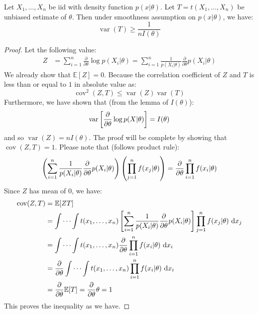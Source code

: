  \begin{theorem}
    Let $X_1,\dots,X_n$ be iid with density function $p(x|\theta)$. Let $T = t(X_1,\dots,X_n)$ be unbiased estimate of $\theta$. Then under smoothness assumption on $p(x|\theta)$, we have:
    \begin{equation*}
        \operatorname{var}(T) \ge \frac{1}{nI(\theta)}
    \end{equation*}
 \end{theorem}
 \begin{proof}
    Let the following value:
    \begin{equation*}
    \begin{aligned}
        Z &= \sum^n_{i=1}\frac{\partial}{\partial\theta}\log p(X_i|\theta) = \sum^n_{i=1}\frac{1}{p(X_i|\theta)} \frac{\partial}{\partial\theta } p(X_i|\theta)
    \end{aligned}
    \end{equation*}
    We already show that $\mathbb{E}[Z] = 0$. Because the correlation coefficient of $Z$ and $T$ is less than or equal to $1$ in absolute value as:
    \begin{equation*}
        \operatorname{cov}^2(Z, T) \le \operatorname{var}(Z)\operatorname{var}(T)
    \end{equation*}
    Furthermore, we have shown that (from the lemma of $I(\theta)$):
    \begin{equation*}
        \operatorname{var}\left[ \frac{\partial}{\partial\theta} \log p(X|\theta) \right] = I(\theta)
    \end{equation*}
    and so $\operatorname{var}(Z) = nI(\theta)$. The proof will be complete by showing that $\operatorname{cov}(Z, T) = 1$. Please note that (follows product rule):
    \begin{equation*}
        \left( \sum^n_{i=1}\frac{1}{p(X_i|\theta)} \frac{\partial}{\partial\theta } p(X_i|\theta) \right)\left( \prod^n_{j=1}f(x_j | \theta) \right) = \frac{\partial}{\partial\theta}\prod^n_{i=1}f(x_i|\theta)
    \end{equation*}
    Since $Z$ has mean of $0$, we have:
    \begin{equation*}
    \begin{aligned}
        \operatorname{cov}(Z, T) &= \mathbb{E}[ZT] \\
        &= \int\cdots\int t(x_1,\dots,x_n) \left[ \sum^n_{i=1}\frac{1}{p(X_i|\theta)} \frac{\partial}{\partial\theta } p(X_i|\theta) \right]\prod^n_{j=1}f(x_j|\theta)\ \mathrm{d} x_j \\
        &= \int\cdots\int t(x_1,\dots,x_n)\frac{\partial}{\partial\theta}\prod^n_{i=1}f(x_i|\theta) \ \mathrm{d} x_i \\
        &= \frac{\partial}{\partial\theta}\int\cdots\int t(x_1,\dots,x_n)\prod^n_{i=1}f(x_i|\theta) \ \mathrm{d} x_i \\
        &= \frac{\partial}{\partial\theta} \mathbb{E}[T] = \frac{\partial}{\partial\theta} \theta = 1
    \end{aligned}
    \end{equation*}
    This proves the inequality as we have. 
\end{proof}

